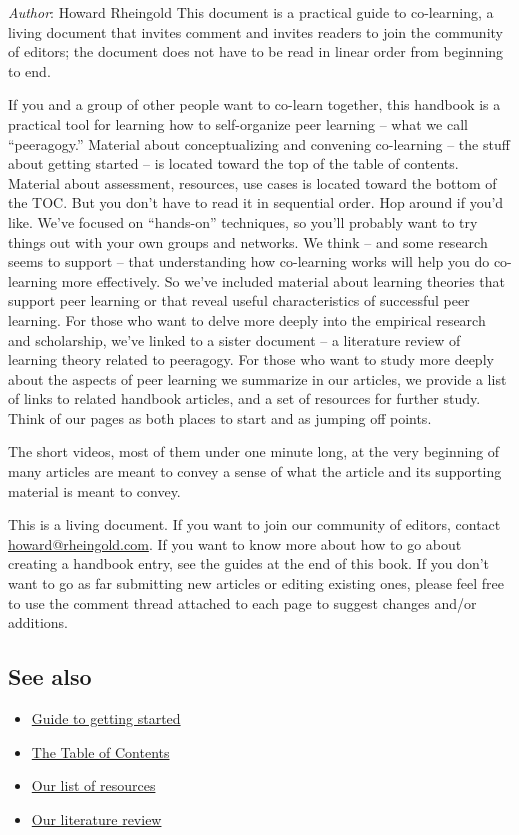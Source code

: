 \emph{Author}: Howard Rheingold This document is a practical guide to
co-learning, a living document that invites comment and invites readers
to join the community of editors; the document does not have to be read
in linear order from beginning to end.

If you and a group of other people want to co-learn together, this
handbook is a practical tool for learning how to self-organize peer
learning -- what we call ``peeragogy.'' Material about conceptualizing
and convening co-learning -- the stuff about getting started -- is
located toward the top of the table of contents. Material about
assessment, resources, use cases is located toward the bottom of the
TOC. But you don't have to read it in sequential order. Hop around if
you'd like. We've focused on ``hands-on'' techniques, so you'll probably
want to try things out with your own groups and networks. We think --
and some research seems to support -- that understanding how co-learning
works will help you do co-learning more effectively. So we've included
material about learning theories that support peer learning or that
reveal useful characteristics of successful peer learning. For those who
want to delve more deeply into the empirical research and scholarship,
we've linked to a sister document -- a literature review of learning
theory related to peeragogy. For those who want to study more deeply
about the aspects of peer learning we summarize in our articles, we
provide a list of links to related handbook articles, and a set of
resources for further study. Think of our pages as both places to start
and as jumping off points.

The short videos, most of them under one minute long, at the very
beginning of many articles are meant to convey a sense of what the
article and its supporting material is meant to convey.

This is a living document. If you want to join our community of editors,
contact \href{mailto:howard@rheingold.com}{howard@rheingold.com}. If you
want to know more about how to go about creating a handbook entry, see
the guides at the end of this book. If you don't want to go as far
submitting new articles or editing existing ones, please feel free to
use the comment thread attached to each page to suggest changes and/or
additions.

\subsection{See also}

\begin{itemize}
\item
  \href{http://peeragogy.org/how-to-get-involved/}{Guide to getting
  started}
\item
  \href{http://peeragogy.org/table-of-contents/}{The Table of Contents}
\item
  \href{http://peeragogy.org/resources/}{Our list of resources}
\item
  \href{http://peeragogy.org/resources/literature-review-peeragogy/}{Our
  literature review}
\end{itemize}
